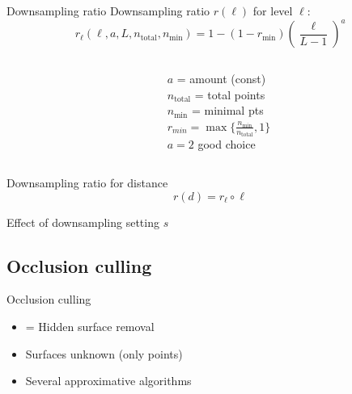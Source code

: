 \documentclass{beamer}
\begin{document}
\begin{frame}{Downsampling ratio}
	Downsampling ratio $r(\ell)$ for level $\ell$: \\
	\begin{displaymath}
		r_{\ell}(\ell, a, L, n_{\text{total}}, n_{\min}) = 1 - (1 - r_{\min}) \left( \frac{\ell}{L-1} \right)^{a}
	\end{displaymath}
	\begin{columns}[c]
		\begin{column}[T]{.7\textwidth}
			\resizebox{!}{.65\textwidth}{}
		\end{column}
		\begin{column}[T]{.3\textwidth}
			$a$ = amount (const) \\
			$n_{\text{total}}$ = total points \\
			$n_{\text{min}}$ = minimal pts \\
			$r_{min} = \max \{ \frac{n_{\min}}{n_{\text{total}}}, 1 \}$ \\
			\vspace{1cm}
			$a = 2$ good choice
		\end{column}
	\end{columns}
\end{frame}


\begin{frame}{Downsampling ratio for distance}
	\begin{displaymath}
		r(d) = r_{\ell} \circ \ell
	\end{displaymath}
	\resizebox{!}{.6\textwidth}{}
\end{frame}


\begin{frame}{Effect of downsampling setting $s$}
	\resizebox{!}{.6\textwidth}{}
\end{frame}


\subsection{Occlusion culling}

\begin{frame}{Occlusion culling}
	\begin{itemize}
	\item = Hidden surface removal
	\item Surfaces unknown (only points)
	\item Several approximative algorithms
	\end{itemize}
\end{frame}
\end{document}
